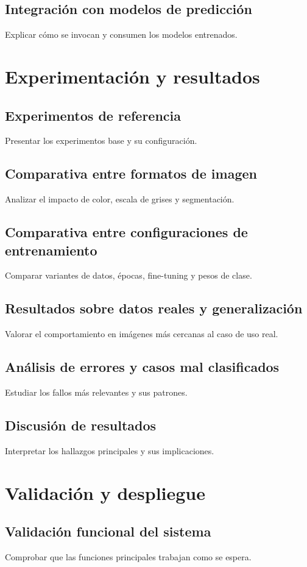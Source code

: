 \documentclass[11pt,spanish,listoffigures,listoftables]{tfgetsinf}
\begin{document}
\section{Integración con modelos de predicción}
Explicar cómo se invocan y consumen los modelos entrenados.

\chapter{Experimentación y resultados}
\section{Experimentos de referencia}
Presentar los experimentos base y su configuración.

\section{Comparativa entre formatos de imagen}
Analizar el impacto de color, escala de grises y segmentación.

\section{Comparativa entre configuraciones de entrenamiento}
Comparar variantes de datos, épocas, fine-tuning y pesos de clase.

\section{Resultados sobre datos reales y generalización}
Valorar el comportamiento en imágenes más cercanas al caso de uso real.

\section{Análisis de errores y casos mal clasificados}
Estudiar los fallos más relevantes y sus patrones.

\section{Discusión de resultados}
Interpretar los hallazgos principales y sus implicaciones.

\chapter{Validación y despliegue}
\section{Validación funcional del sistema}
Comprobar que las funciones principales trabajan como se espera.
\end{document}
